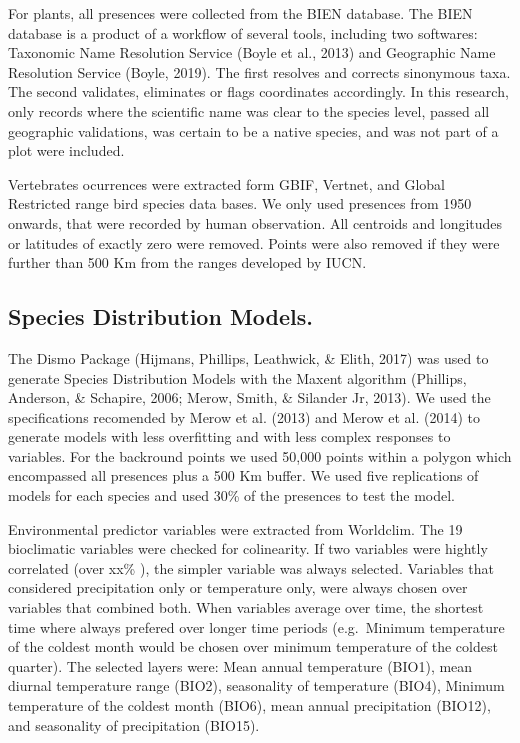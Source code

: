 \documentclass[]{article}
\begin{document}
For plants, all presences were collected from the BIEN database. The BIEN database is a product of a workflow of several tools, including two softwares: Taxonomic Name Resolution Service (Boyle et al., 2013) and Geographic Name Resolution Service (Boyle, 2019). The first resolves and corrects sinonymous taxa. The second validates, eliminates or flags coordinates accordingly. In this research, only records where the scientific name was clear to the species level, passed all geographic validations, was certain to be a native species, and was not part of a plot were included.

Vertebrates ocurrences were extracted form GBIF, Vertnet, and Global Restricted range bird species data bases. We only used presences from 1950 onwards, that were recorded by human observation. All centroids and longitudes or latitudes of exactly zero were removed. Points were also removed if they were further than 500 Km from the ranges developed by IUCN.

\hypertarget{species-distribution-models.}{%
\subsection{Species Distribution Models.}\label{species-distribution-models.}}

The Dismo Package (Hijmans, Phillips, Leathwick, \& Elith, 2017) was used to generate Species Distribution Models with the Maxent algorithm (Phillips, Anderson, \& Schapire, 2006; Merow, Smith, \& Silander Jr, 2013). We used the specifications recomended by Merow et al. (2013) and Merow et al. (2014) to generate models with less overfitting and with less complex responses to variables.
For the backround points we used 50,000 points within a polygon which encompassed all presences plus a 500 Km buffer. We used five replications of models for each species and used 30\% of the presences to test the model.

Environmental predictor variables were extracted from Worldclim. The 19 bioclimatic variables were checked for colinearity. If two variables were hightly correlated (over xx\% ), the simpler variable was always selected. Variables that considered precipitation only or temperature only, were always chosen over variables that combined both. When variables average over time, the shortest time where always prefered over longer time periods (e.g.~Minimum temperature of the coldest month would be chosen over minimum temperature of the coldest quarter). The selected layers were: Mean annual temperature (BIO1), mean diurnal temperature range (BIO2), seasonality of temperature (BIO4), Minimum temperature of the coldest month (BIO6), mean annual precipitation (BIO12), and seasonality of precipitation (BIO15).
\end{document}
